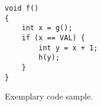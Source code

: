 \begin{figure}[t]
\begin{lstlisting}[frame=single,basicstyle=\ttfamily\small]	
void f()
{
    int x = g();
    if (x == VAL) {
        int y = x + 1;
        h(y);
    }
}
\end{lstlisting}
\vspace{-12pt}
\caption{Exemplary code sample.}
\label{figure:sample}
\end{figure}